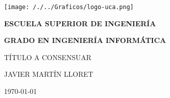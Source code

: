 


\begin{titlepage}

  \begin{center}

    \texttt{[image: /./../Graficos/logo-uca.png]} \\
    
    \vspace{2.5cm}
    
    \LARGE{\textbf{ESCUELA SUPERIOR DE INGENIERÍA}} \\
    
    \vspace{1.0cm}
    
    \Large{\textbf{GRADO EN INGENIERÍA INFORMÁTICA}} \\
    
    \vspace{3.0cm}
    
    \Large{TÍTULO A CONSENSUAR} \\
    
    \vspace{2.5cm}
    
    \Large{JAVIER MARTÍN LLORET} \\
  
    \vspace{0.5cm}

    \large{\today}
    
  \end{center}
\end{titlepage}